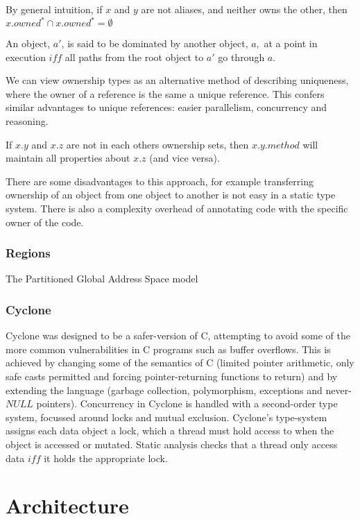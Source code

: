 \documentclass{article}
\begin{document}
By general intuition, if $x$ and $y$ are not aliases, and neither owns the other, then $x.owned^{*} \cap x.owned^{*} = \emptyset$

An object, $a'$, is said to be dominated by another object, $a,$ at a point in execution $iff$ all paths from the root object to $a'$ go through $a$.

We can view ownership types as an alternative method of describing uniqueness, where the owner of a reference is the same a unique reference.
This confers similar advantages to unique references: easier parallelism, concurrency and reasoning.

If $x.y$ and $x.z$ are not in each others ownership sets, then $x.y.method$ will maintain
all properties about $x.z$ (and vice versa).

There are some disadvantages to this approach, for example transferring ownership of an object from one object to another is not easy in a static type system\cite{clarke1998}.
There is also a complexity overhead of annotating code with the specific owner of the code.

\subsubsection{Regions}

The Partitioned Global Address Space model\cite{pgas} 

\subsubsection{Cyclone}

Cyclone was designed to be a safer-version of C, attempting to avoid some of the more common vulnerabilities in C programs such as buffer overflows.
This is achieved by changing some of the semantics of C (limited pointer arithmetic, only safe casts permitted and forcing pointer-returning functions to return) and by extending the language (garbage collection, polymorphism, exceptions and never-$NULL$ pointers).
Concurrency in Cyclone is handled with a second-order type system, focussed around locks and mutual exclusion.
Cyclone's type-system assigns each data object a lock, which a thread must hold access to when the object is accessed or mutated.
Static analysis checks that a thread only access data $iff$ it holds the appropriate lock.


\section{Architecture}
\end{document}
